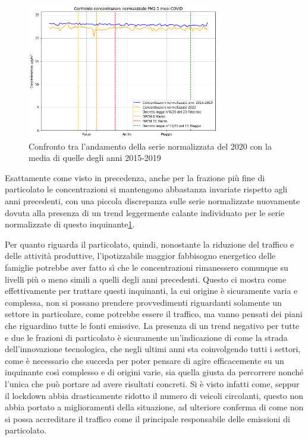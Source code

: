 \begin{figure}[h]
\centering
\includegraphics[width=0.75\textwidth]{pm25_covid_norm}
\caption{Confronto tra l'andamento della serie normalizzata del 2020 con la media di quelle degli anni 2015-2019}
\label{fig:pm25_covid_norm}
\end{figure}

Esattamente come visto in precedenza, anche per la frazione più fine di particolato le concentrazioni si mantengono abbastanza invariate rispetto agli anni precedenti, con una piccola discrepanza sulle serie normalizzate nuovamente dovuta alla presenza di un trend leggermente calante individuato per le serie normalizzate di questo inquinante\ref{fig:pm25_covid_norm}.

Per quanto riguarda il particolato, quindi, nonostante la riduzione del traffico e delle attività produttive, l'ipotizzabile maggior fabbisogno energetico
 delle famiglie potrebbe aver fatto sì che le concentrazioni rimanessero comunque su livelli più o meno simili a quelli degli anni precedenti.
Questo ci mostra come effettivamente per trattare questi inquinanti, la cui origine è sicuramente varia e complessa, non si possano prendere provvedimenti riguardanti solamente un settore in particolare, come potrebbe essere il traffico, ma vanno pensati dei piani che riguardino tutte le fonti emissive.
La presenza di un trend negativo per tutte e due le frazioni di particolato è sicuramente un'indicazione di come la strada dell'innovazione tecnologica, che negli ultimi anni sta coinvolgendo tutti i settori, come è necessario che succeda per poter pensare di agire efficacemente su un inquinante così complesso e di origini varie, sia quella giusta da percorrere nonché l'unica che può portare ad avere risultati concreti. Si è visto infatti come, seppur il lockdown abbia drasticamente ridotto il numero di veicoli circolanti, questo non abbia portato a miglioramenti della situazione, ad ulteriore conferma di come non si possa accreditare il traffico come il principale responsabile delle emissioni di particolato.

